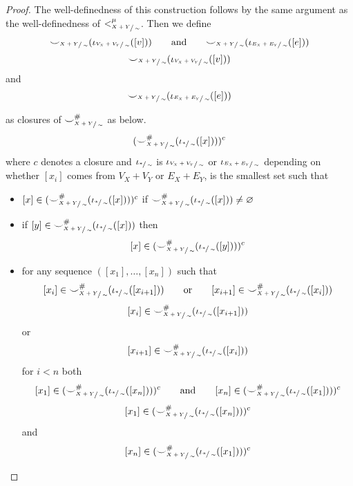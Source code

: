 \begin{proof}
	The well-definedness of this construction follows by the same argument as the well-definedness of $<_{\sfrac{X+Y}{\sim}}^{\mu}$.
	Then we define
	\ifdefined \ONECOLUMN
		\[
			{\smile}_{\sfrac{X+Y}{\sim}}(\iota_{\sfrac{V_{X} + V_{Y}}{\sim}}([v])) \qquad \text{and} \qquad {\smile}_{\sfrac{X+Y}{\sim}}(\iota_{\sfrac{E_{X} + E_{Y}}{\sim}}([e]))
		\]
	\else
		\[
			{\smile}_{\sfrac{X+Y}{\sim}}(\iota_{\sfrac{V_{X} + V_{Y}}{\sim}}([v]))
		\]
		and
		\[
			{\smile}_{\sfrac{X+Y}{\sim}}(\iota_{\sfrac{E_{X} + E_{Y}}{\sim}}([e]))
		\]
	\fi

	as closures of ${\smile}^{{\#}}_{\sfrac{X+Y}{\sim}}$ as below.
	\[
		({\smile}^{{\#}}_{\sfrac{X+Y}{\sim}}(\iota_{\sfrac{*}{\sim}}([x])))^{c}
	\]
	where $c$ denotes a closure and $\iota_{\sfrac{*}{\sim}}$ is $\iota_{\sfrac{V_{X} + V_{Y}}{\sim}}$ or $\iota_{\sfrac{E_{X} + E_{Y}}{\sim}}$ depending on whether $[x_i]$ comes from $V_{X} + V_{Y}$ or $E_{X} + E_{Y}$, is the smallest set such that
	\begin{itemize}
		\item $[x] \in ({\smile}^{{\#}}_{\sfrac{X+Y}{\sim}}(\iota_{\sfrac{*}{\sim}}([x])))^{c}$ if ${\smile}^{{\#}}_{\sfrac{X+Y}{\sim}}(\iota_{\sfrac{*}{\sim}}([x])) \not = \varnothing$
		\item if $[y] \in {\smile}^{{\#}}_{\sfrac{X+Y}{\sim}}(\iota_{\sfrac{*}{\sim}}([x]))$ then
		      \[
			      [x] \in ({\smile}^{{\#}}_{\sfrac{X+Y}{\sim}}(\iota_{\sfrac{*}{\sim}}([y])))^{c}
		      \]
		\item for any sequence $([x_1], \ldots, [x_n])$ such that
		      \ifdefined \ONECOLUMN
			      \[[x_i] \in {\smile}^{{\#}}_{\sfrac{X+Y}{\sim}}(\iota_{\sfrac{*}{\sim}}([x_{i+1}])) \qquad \text{or} \qquad [x_{i+1}] \in {\smile}^{{\#}}_{\sfrac{X+Y}{\sim}}(\iota_{\sfrac{*}{\sim}}([x_{i}]))\]
		      \else
			      \[
				      [x_i] \in {\smile}^{{\#}}_{\sfrac{X+Y}{\sim}}(\iota_{\sfrac{*}{\sim}}([x_{i+1}]))
			      \] or
			      \[
				      [x_{i+1}] \in {\smile}^{{\#}}_{\sfrac{X+Y}{\sim}}(\iota_{\sfrac{*}{\sim}}([x_{i}]))
			      \]
		      \fi
		      for $i < n$ both
		      \ifdefined \ONECOLUMN
			      \[
				      [x_1] \in ({\smile}^{{\#}}_{\sfrac{X+Y}{\sim}}(\iota_{\sfrac{*}{\sim}}([x_{n}])))^{c} \qquad \text{and} \qquad [x_n] \in ({\smile}^{{\#}}_{\sfrac{X+Y}{\sim}}(\iota_{\sfrac{*}{\sim}}([x_{1}])))^{c}
			      \]
		      \else
			      \[
				      [x_1] \in ({\smile}^{{\#}}_{\sfrac{X+Y}{\sim}}(\iota_{\sfrac{*}{\sim}}([x_{n}])))^{c}
			      \]
			      and
			      \[
				      [x_n] \in ({\smile}^{{\#}}_{\sfrac{X+Y}{\sim}}(\iota_{\sfrac{*}{\sim}}([x_{1}])))^{c}
			      \]
		      \fi
	\end{itemize}


\end{proof}
